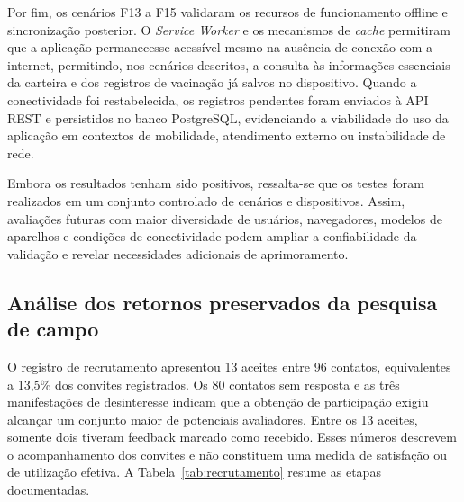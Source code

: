 \documentclass{UNESC}
\begin{document}
Por fim, os cenários F13 a F15 validaram os recursos de funcionamento offline e sincronização posterior. O \textit{Service Worker} e os mecanismos de \textit{cache} permitiram que a aplicação permanecesse acessível mesmo na ausência de conexão com a internet, permitindo, nos cenários descritos, a consulta às informações essenciais da carteira e dos registros de vacinação já salvos no dispositivo. Quando a conectividade foi restabelecida, os registros pendentes foram enviados à API REST e persistidos no banco PostgreSQL, evidenciando a viabilidade do uso da aplicação em contextos de mobilidade, atendimento externo ou instabilidade de rede.

Embora os resultados tenham sido positivos, ressalta-se que os testes foram realizados em um conjunto controlado de cenários e dispositivos. Assim, avaliações futuras com maior diversidade de usuários, navegadores, modelos de aparelhos e condições de conectividade podem ampliar a confiabilidade da validação e revelar necessidades adicionais de aprimoramento.

\subsection{Análise dos retornos preservados da pesquisa de campo}

O registro de recrutamento apresentou 13 aceites entre 96 contatos, equivalentes a 13,5\% dos convites registrados. Os 80 contatos sem resposta e as três manifestações de desinteresse indicam que a obtenção de participação exigiu alcançar um conjunto maior de potenciais avaliadores. Entre os 13 aceites, somente dois tiveram feedback marcado como recebido. Esses números descrevem o acompanhamento dos convites e não constituem uma medida de satisfação ou de utilização efetiva. A Tabela~\ref{tab:recrutamento} resume as etapas documentadas.
\end{document}
